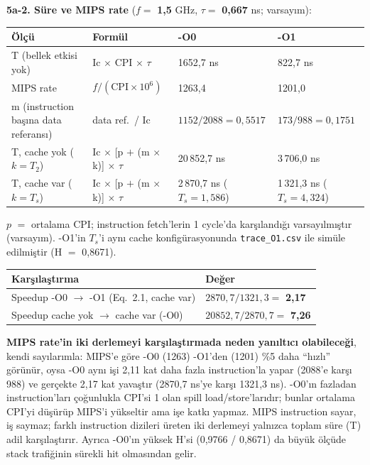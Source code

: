 \documentclass[11pt,a4paper]{article}
\newcommand{\tl}{\texttt}
\newcommand{\hd}[1]{\cellcolor{hdr}#1}
\begin{document}
\textbf{5a-2. Süre ve MIPS rate} ($f = $ \textbf{1,5} GHz, $\tau = $ \textbf{0,667} ns; varsayım):

\begin{longtable}{|p{4.6cm}|p{4.2cm}|p{3.2cm}|p{3.2cm}|}
\hline
\hd{Ölçü} & \hd{Formül} & \hd{-O0} & \hd{-O1}\\
\hline
T (bellek etkisi yok) & Ic $\times$ CPI $\times$ $\tau$ & 1652,7 ns & 822,7 ns\\ \hline
MIPS rate & $f / (\text{CPI} \times 10^6)$ & 1263,4 & 1201,0\\ \hline
m (instruction başına data referansı) & data ref.\ / Ic & $1152/2088 = 0{,}5517$ & $173/988 = 0{,}1751$\\ \hline
T, cache yok ($k = T_2$) & Ic $\times$ [p $+$ (m $\times$ k)] $\times$ $\tau$ & 20\,852,7 ns & 3\,706,0 ns\\ \hline
T, cache var ($k = T_s$) & Ic $\times$ [p $+$ (m $\times$ k)] $\times$ $\tau$ & 2\,870,7 ns ($T_s = 1{,}586$) & 1\,321,3 ns ($T_s = 4{,}324$)\\ \hline
\end{longtable}

$p$ $=$ ortalama CPI; instruction fetch'lerin 1 cycle'da karşılandığı varsayılmıştır (varsayım).
-O1'in $T_s$'i aynı cache konfigürasyonunda \tl{trace\_O1.csv} ile simüle edilmiştir
(H $=$ 0,8671).

\begin{longtable}{|p{11.0cm}|p{4.5cm}|}
\hline
\hd{Karşılaştırma} & \hd{Değer}\\
\hline
Speedup -O0 $\to$ -O1 (Eq.~2.1, cache var) & $2870{,}7 / 1321{,}3 = $ \textbf{2,17}\\ \hline
Speedup cache yok $\to$ cache var (-O0) & $20852{,}7 / 2870{,}7 = $ \textbf{7,26}\\ \hline
\end{longtable}

\textbf{MIPS rate'in iki derlemeyi karşılaştırmada neden yanıltıcı olabileceği}, kendi
sayılarımla: MIPS'e göre -O0 (1263) -O1'den (1201) \%5 daha ``hızlı'' görünür, oysa -O0 aynı işi
2,11 kat daha fazla instruction'la yapar (2088'e karşı 988) ve gerçekte 2,17 kat yavaştır
(2870,7 ns'ye karşı 1321,3 ns). -O0'ın fazladan instruction'ları çoğunlukla CPI'si 1 olan spill
load/store'larıdır; bunlar ortalama CPI'yi düşürüp MIPS'i yükseltir ama işe katkı yapmaz. MIPS
instruction sayar, iş saymaz; farklı instruction dizileri üreten iki derlemeyi yalnızca toplam
süre (T) adil karşılaştırır. Ayrıca -O0'ın yüksek H'si (0,9766 / 0,8671) da büyük ölçüde stack
trafiğinin sürekli hit olmasından gelir.
\end{document}
